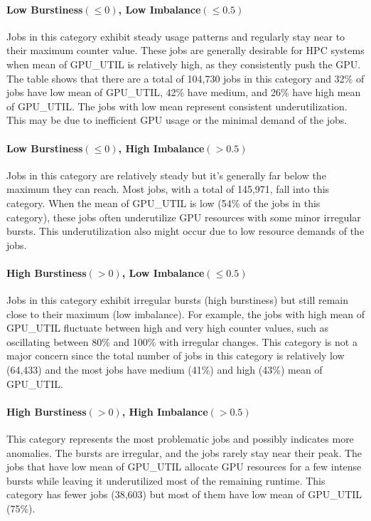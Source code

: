 \paragraph{Low Burstiness$(\leq0)$, Low Imbalance$(\leq 0.5)$} Jobs in this
category exhibit steady usage patterns and regularly stay near to their maximum
counter value. These jobs are generally desirable for HPC systems when mean
of GPU\_UTIL is relatively high, as they consistently push the GPU. The table
shows that there are a total of 104,730 jobs in this category and 32\% of jobs
have low mean of GPU\_UTIL, 42\% have medium, and 26\% have high mean of GPU\_UTIL.
The jobs with low mean represent consistent underutilization. This
may be due to inefficient GPU usage or the minimal demand of the jobs.

\paragraph{Low Burstiness$(\leq0)$, High Imbalance$(>0.5)$} Jobs in this
category are relatively steady but it's generally far below the maximum they
can reach. Most jobs, with a total of 145,971, fall into this category. When
the mean of GPU\_UTIL is low (54\% of the jobs in this category), these jobs
often underutilize GPU resources with some minor irregular bursts. This
underutilization also might occur due to low resource demands of the jobs.

\paragraph{High Burstiness$(>0)$, Low Imbalance$(\leq 0.5)$} Jobs in this
category exhibit irregular bursts (high burstiness) but still remain close to
their maximum (low imbalance). For example, the jobs with high mean
of GPU\_UTIL fluctuate between high and very high counter values, such as
oscillating between 80\% and 100\% with irregular changes. This category is not
a major concern since the total number of jobs in this category is relatively
low (64,433) and the most jobs have medium (41\%) and high (43\%) mean of GPU\_UTIL.

\paragraph{High Burstiness$(>0)$, High Imbalance$(>0.5)$} This category
represents the most problematic jobs and possibly indicates more anomalies. The
bursts are irregular, and the jobs rarely stay near their peak. The jobs that
have low mean of GPU\_UTIL allocate GPU resources for a few intense bursts while
leaving it underutilized most of the remaining runtime. This category has
fewer jobs (38,603) but most of them have low mean of GPU\_UTIL (75\%).
